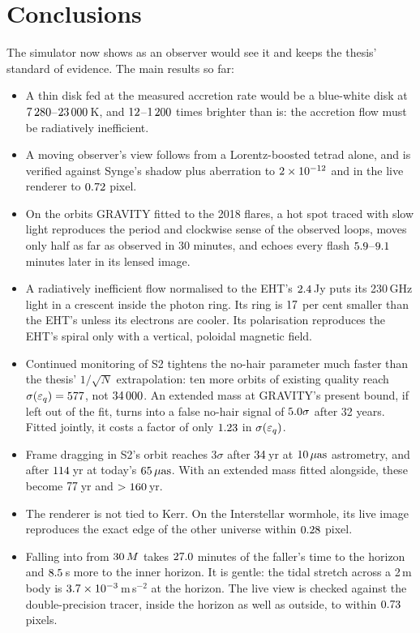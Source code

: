 \chapter{Conclusions}
\label{ch:xconclusions}

The simulator now shows \sgra{} as an observer would see it and keeps the
thesis' standard of evidence. The main results so far:
\begin{itemize}
\item A thin disk fed at the measured accretion rate would be a blue-white
disk at $7\,280$--$23\,000$\,K, and $12$--$1\,200$
times brighter than \sgra{} is: the accretion flow must be radiatively
inefficient.
\item A moving observer's view follows from a Lorentz-boosted tetrad alone,
and is verified against Synge's shadow plus aberration to
$2\times10^{-12}$ and in the live renderer to $0.72$ pixel.
\item On the orbits GRAVITY fitted to the 2018 flares, a hot spot traced with
slow light reproduces the period and clockwise sense of the observed loops,
moves only half as far as observed in 30 minutes, and echoes every flash
$5.9$--$9.1$ minutes later in its lensed image.
\item A radiatively inefficient flow normalised to the EHT's
$2.4$\,Jy puts its 230\,GHz light in a crescent inside the photon
ring. Its ring is $17$ per cent smaller than the EHT's unless
its electrons are cooler. Its polarisation reproduces the EHT's spiral only
with a vertical, poloidal magnetic field.
\end{itemize}

\begin{itemize}
\item Continued monitoring of S2 tightens the no-hair parameter much faster
than the thesis' $1/\sqrt{N}$ extrapolation: ten more orbits of existing
quality reach $\sigma(\varepsilon_q) = 577$, not $34\,000$. An
extended mass at GRAVITY's present bound, if left out of the fit, turns into
a false no-hair signal of $5.0\sigma$ after 32 years. Fitted
jointly, it costs a factor of only $1.23$ in $\sigma(\varepsilon_q)$.
\item Frame dragging in S2's orbit reaches $3\sigma$ after
$34$\,yr at $10\,\mu\mathrm{as}$ astrometry, and after
$114$\,yr at today's $65\,\mu\mathrm{as}$. With an extended mass
fitted alongside, these become $77$\,yr and
$>160$\,yr.
\item The renderer is not tied to Kerr. On the Interstellar wormhole, its live
image reproduces the exact edge of the other universe within $0.28$
pixel.
\item Falling into \sgra{} from $30\,M$ takes $27.0$ minutes
of the faller's time to the horizon and $8.5$\,s more to the
inner horizon. It is gentle: the tidal stretch across a 2\,m body is
$3.7\times10^{-3}$\,m\,s$^{-2}$ at the horizon. The live view is checked
against the double-precision tracer, inside the horizon as well as outside,
to within $0.73$ pixels.
\end{itemize}
